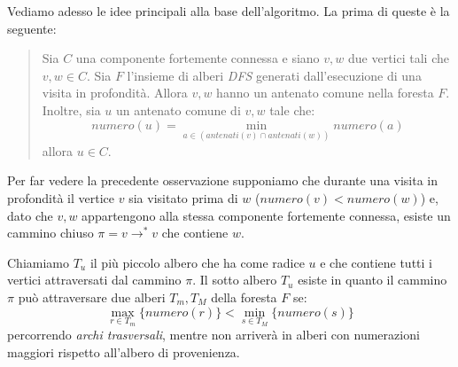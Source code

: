 Vediamo adesso le idee principali alla base dell'algoritmo. La prima
di queste \`e la seguente:
\begin{quotation}
  Sia $C$ una componente fortemente connessa e siano $v, w$ due
  vertici tali che $v, w \in C$. Sia $F$ l'insieme di alberi
  \emph{DFS} generati dall'esecuzione di una visita in
  profondit\`a. Allora $v, w$ hanno un antenato comune nella foresta
  $F$. Inoltre, sia $u$ un antenato comune di $v, w$ tale che:
  \begin{displaymath}
    numero(u) = \min_{a \in (antenati(v)\cap antenati(w))}{numero(a)}
  \end{displaymath}
  allora $u \in C$.
\end{quotation}
Per far vedere la precedente osservazione supponiamo che durante una
visita in profondit\`a il vertice $v$ sia visitato prima di $w$
($numero(v) < numero(w)$) e, dato che $v,w$ appartengono alla stessa
componente fortemente connessa, esiste un cammino chiuso $\pi = v
\rightarrow^{*} v$ che contiene $w$. 

Chiamiamo $T_{u}$ il pi\`u piccolo albero che ha come radice $u$ e che
contiene tutti i vertici attraversati dal cammino $\pi$. Il sotto
albero $T_{u}$ esiste in quanto il cammino $\pi$ pu\`o attraversare
due alberi $T_{m}, T_{M}$ della foresta $F$ se:
\begin{displaymath}
  \max_{r \in T_{m}}\{numero(r)\} < \min_{s \in T_{M}}\{numero(s)\}
\end{displaymath}
percorrendo \emph{archi trasversali}, mentre non arriver\`a in alberi
con numerazioni maggiori rispetto all'albero di provenienza.

